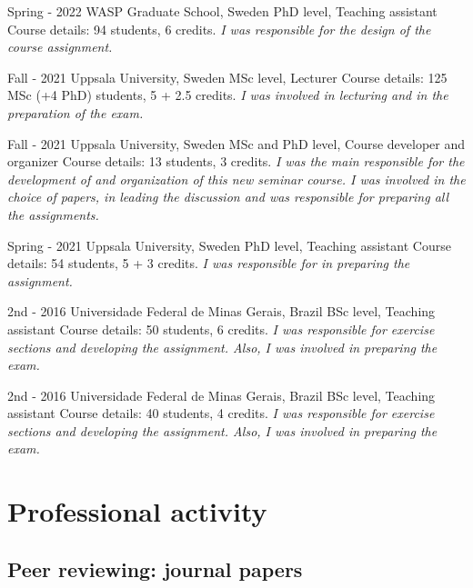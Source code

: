 \documentclass[10pt,letterpaper]{article} %
\begin{document}
    {   Spring - 2022  }
    { WASP Graduate School, Sweden }
    { PhD level, Teaching assistant }
    { Course details: 94 students, 6 credits.  \emph{ I was responsible for the design of the course assignment. } }
    
    {   Fall - 2021  }
    { Uppsala University, Sweden }
    { MSc level, Lecturer }
    { Course details: 125 MSc (+4 PhD) students, 5 + 2.5 credits.  \emph{ I was involved in lecturing and in the preparation of the exam. } }
    
    {   Fall - 2021  }
    { Uppsala University, Sweden }
    { MSc and PhD level, Course developer and organizer }
    { Course details: 13 students, 3 credits.  \emph{ I was the main responsible for the development of and organization of this new seminar course. I was involved in the choice of papers, in leading the discussion and was responsible for preparing all the assignments. } }
    
    {   Spring - 2021  }
    { Uppsala University, Sweden }
    { PhD level, Teaching assistant }
    { Course details: 54 students, 5 + 3 credits.  \emph{ I was responsible for in preparing the assignment. } }
    
    {   2nd - 2016  }
    { Universidade Federal de Minas Gerais, Brazil }
    { BSc level, Teaching assistant }
    { Course details: 50 students, 6 credits.  \emph{ I was responsible for exercise sections and developing the assignment. Also, I was involved in preparing the exam. } }
    
    {   2nd - 2016  }
    { Universidade Federal de Minas Gerais, Brazil }
    { BSc level, Teaching assistant }
    { Course details: 40 students, 4 credits.  \emph{ I was responsible for exercise sections and developing the assignment. Also, I was involved in preparing the exam. } }
    




\section*{Professional activity}

\subsection*{Peer reviewing: journal papers}
\end{document}
